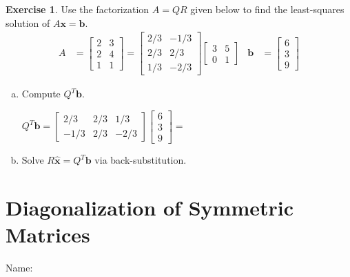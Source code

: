 \documentclass[10pt]{book}
\theoremstyle{definition}
\newtheorem{exercise}{Exercise}[section]
\newcommand{\name}[1][2.5in]{\vspace{-2.3em}\hfill Name: \underline{\hspace{#1}}}
\newcommand{\vect}[1]{\ensuremath{\boldsymbol{\mathbf{#1}}}}
\newcommand{\Axb}{A\vect{x}=\vect{b}}
\newcommand{\xhat}{\hat{\vect{x}}}
\begin{document}
\begin{exercise} %
	Use the factorization $A=QR$ given below to find the least-squares solution of $\Axb$.
	\begin{align*}
	A &= \begin{bmatrix}2&3\\2&4\\1&1\end{bmatrix} =
	\begin{bmatrix}2/3&-1/3\\2/3&2/3\\1/3&-2/3\end{bmatrix}
	\begin{bmatrix}3&5\\0&1\end{bmatrix} &
	\vect{b} &= \begin{bmatrix}6\\3\\9\end{bmatrix}
	\end{align*}
	\begin{enumerate}[(a)]
		\item Compute $Q^T\vect{b}$. \par
		$ Q^T\vect{b}= \begin{bmatrix}2/3&2/3&1/3\\-1/3&2/3&-2/3\end{bmatrix}
		\begin{bmatrix}6\\3\\9\end{bmatrix} = $
		\vspace{2em}
		\item Solve $R\xhat=Q^T\vect{b}$ via back-substitution.
		\vspace{1in}
	\end{enumerate}
\end{exercise}


\newpage


\setcounter{section}{0}

\section[Diag. of Sym. Matrices]{Diagonalization of Symmetric Matrices}
\name[1.5in]
\end{document}
